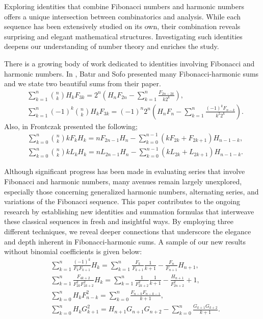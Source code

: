 \documentclass[12pt,reqno]{article}
\begin{document}
	\par Exploring identities that combine Fibonacci numbers and harmonic numbers offers a unique intersection between combinatorics and analysis. While each sequence has been extensively studied on its own, their combination reveals surprising and elegant mathematical structures. Investigating such identities deepens our understanding of number theory and enriches the study.
	\par There is a growing body of work dedicated to identities involving Fibonacci and harmonic numbers. 
	In \cite{Batir21}, Bat\i r and Sofo presented many Fibonacci-harmonic sums and we state two beautiful sums from their paper.
	\begin{align*}
		&\sum_{k=1}^n \binom{n}{k} H_k F_{3k} = 2^n \left(H_n F_{2n} - \sum_{k=1}^n \frac{F_{2n-2k}}{k2^k}\right), \\
		&\sum_{k=1}^n (-1)^k \binom{n}{k} H_k F_{3k} = (-1)^n 2^n \left(H_n F_n - \sum_{k=1}^n \frac{(-1)^k F_{n-k}}{k^2 2^k}\right).
	\end{align*}
	Also, in \cite{Frontczak20} Frontczak presented the following;
	\begin{align*}
		&\sum_{k=0}^n \binom{n}{k} k F_k H_k = n F_{2n-1} H_n - \sum_{k=0}^{n-1} \left(k F_{2k}+F_{2k+1}\right) H_{n-1-k}, \\
		&\sum_{k=0}^n \binom{n}{k} k L_k H_k = n L_{2n-1} H_n - \sum_{k=0}^{n-1} \left(k L_{2k}+L_{2k+1}\right) H_{n-1-k}.
	\end{align*}
	\par Although significant progress has been made in evaluating series that involve Fibonacci and harmonic numbers, many avenues remain largely unexplored, especially those concerning generalized harmonic numbers, alternating series, and variations of the Fibonacci sequence. This paper contributes to the ongoing research by establishing new identities and summation formulas that interweave these classical sequences in fresh and insightful ways. By employing three different techniques, we reveal deeper connections that underscore the elegance and depth inherent in Fibonacci-harmonic sums. A sample of our new results without binomial coefficients is given below:
	\begin{align*}
	&\sum_{k=1}^n \frac{(-1)^{k}}{F_{k} F_{k+1}} H_{k} = \sum_{k=1}^n \frac{F_{k}}{F_{k+1}}\frac{1}{k+1} - \frac{F_{n}}{F_{n+1}} H_{n+1}, \\
	&\sum_{k=1}^n \frac{F_{4k+2}}{F_{2k}^2 F_{2k+2}^2} H_{k} = \sum_{k=1}^n \frac{1}{F_{2k+2}^2}\frac{1}{k+1} - \frac{H_{n+1}}{F_{2n+2}^2} + 1,\\
	&\sum_{k = 0}^n H_k F_{n - k}^2 = \sum_{k = 0}^n \frac{{F_{n - k} F_{n - k - 1} }}{{k + 1}}, \\
	&\sum_{k = 0}^n H_k G_{k + 1}^2 = H_{n + 1} G_{n + 1} G_{n + 2} - \sum_{k = 0}^n \frac{G_{k + 1} G_{k + 2}}{k + 1}.
	\end{align*}
\end{document}
